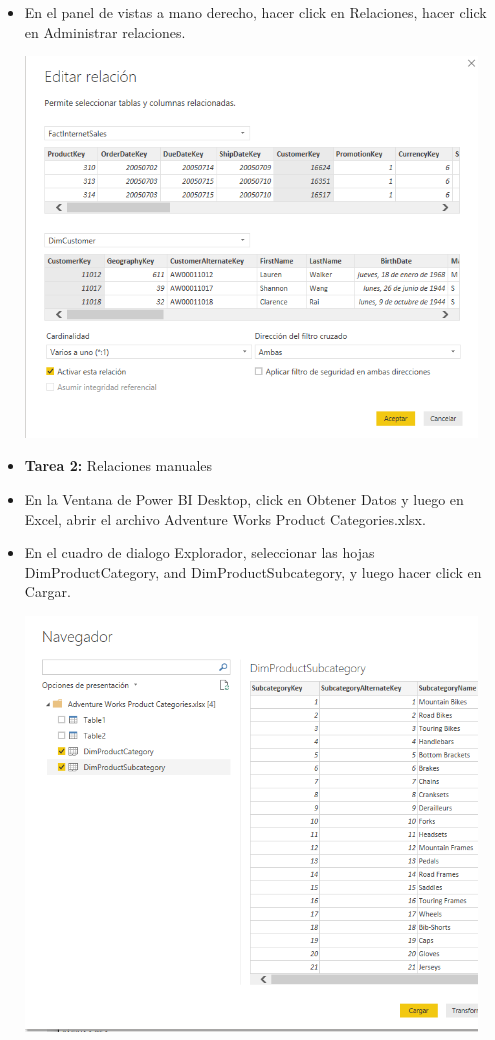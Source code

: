\documentclass[12pt,letterpaper]{article}
\begin{document}
\begin{itemize}
	\item En el panel de vistas a mano derecho, hacer click en Relaciones, hacer click en Administrar relaciones.
\begin{center}
\includegraphics[width=12cm]{./Imagenes/2-}
\end{center}
	\item \textbf{Tarea 2:} Relaciones manuales
	\item En la Ventana de Power BI Desktop, click en Obtener Datos y luego en Excel, abrir el archivo Adventure Works Product Categories.xlsx.
	\item En el cuadro de dialogo Explorador, seleccionar las hojas DimProductCategory, and
DimProductSubcategory, y luego hacer click en Cargar.
\begin{center}
\includegraphics[width=12cm]{./Imagenes/3}

\end{center}
\end{itemize}
\end{document}
